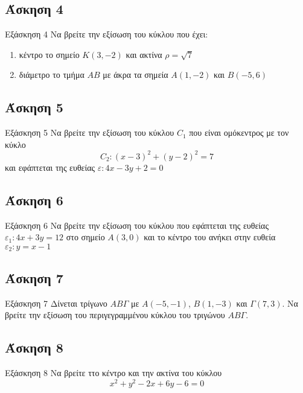 \documentclass[greek]{beamer}
\begin{document}
\subsection{Άσκηση 4}
\begin{frame}[label=Άσκηση4,t]{Εξάσκηση 4}
  Να βρείτε την εξίσωση του κύκλου που έχει:
  \begin{enumerate}
    \item<1-> κέντρο το σημείο $Κ(3,-2)$ και ακτίνα $ρ=\sqrt{7}$
    \item<2-> διάμετρο το τμήμα $ΑΒ$ με άκρα τα σημεία $Α(1,-2)$ και $Β(-5,6)$
  \end{enumerate}

\end{frame}

\subsection{Άσκηση 5}
\begin{frame}[label=Άσκηση5,t]{Εξάσκηση 5}
  Να βρείτε την εξίσωση του κύκλου $C_1$ που είναι ομόκεντρος με τον κύκλο
  $$C_2:(x-3)^2+(y-2)^2=7$$
  και εφάπτεται της ευθείας $ε:4x-3y+2=0$

\end{frame}

\subsection{Άσκηση 6}
\begin{frame}[label=Άσκηση6,t]{Εξάσκηση 6}
  Να βρείτε την εξίσωση του κύκλου που εφάπτεται της ευθείας $ε_1:4x+3y=12$ στο σημείο $Α(3,0)$ και το κέντρο του ανήκει στην ευθεία $ε_2:y=x-1$

\end{frame}

\subsection{Άσκηση 7}
\begin{frame}[label=Άσκηση7,t]{Εξάσκηση 7}
  Δίνεται τρίγωνο $ΑΒΓ$ με $Α(-5,-1)$, $Β(1,-3)$ και $Γ(7,3)$. Να βρείτε την εξίσωση του περιγεγραμμένου κύκλου του τριγώνου $ΑΒΓ$.

\end{frame}

\subsection{Άσκηση 8}
\begin{frame}[label=Άσκηση8,t]{Εξάσκηση 8}
  Να βρείτε ττο κέντρο και την ακτίνα του κύκλου
  $$x^2+y^2-2x+6y-6=0$$

\end{frame}
\end{document}
